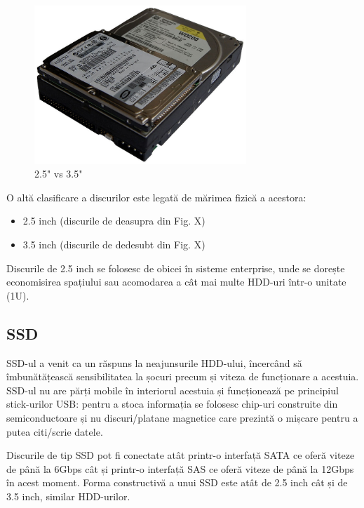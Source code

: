 
\begin{figure}[!htbp]
	\centering
	\includegraphics[width=8cm]{chapters/10-storage/img/size-comp-img.png}
	\caption{2.5" vs 3.5"\protect\footnotemark}
	\label{fig:storage-size-comp}
\end{figure}


O altă clasificare a discurilor este legată de mărimea fizică a acestora:

\begin{itemize}
	\item 2.5 inch (discurile de deasupra din Fig. X)
	\item 3.5 inch (discurile de dedesubt din Fig. X)
\end{itemize}


Discurile de 2.5 inch se folosesc de obicei în sisteme enterprise, unde se
dorește economisirea spațiului sau acomodarea a cât mai multe HDD-uri într-o
unitate (1U).

\subsection{SSD}
\label{sec:storage-tipuri-ssd}

SSD-ul a venit ca un răspuns la neajunsurile HDD-ului, încercând să
îmbunătățească sensibilitatea la șocuri precum și viteza de funcționare a
acestuia. SSD-ul nu are părți mobile în interiorul acestuia și funcționează pe
principiul stick-urilor USB: pentru a stoca informația se folosesc chip-uri
construite din semiconductoare și nu discuri/platane magnetice care prezintă o
mișcare pentru a putea citi/scrie datele.

Discurile de tip SSD pot fi conectate atât printr-o interfață SATA ce oferă
viteze de până la 6Gbps cât și printr-o interfață SAS ce oferă viteze de până la
12Gbps în acest moment. Forma constructivă a unui SSD este atât de 2.5 inch cât
și de 3.5 inch, similar HDD-urilor.


